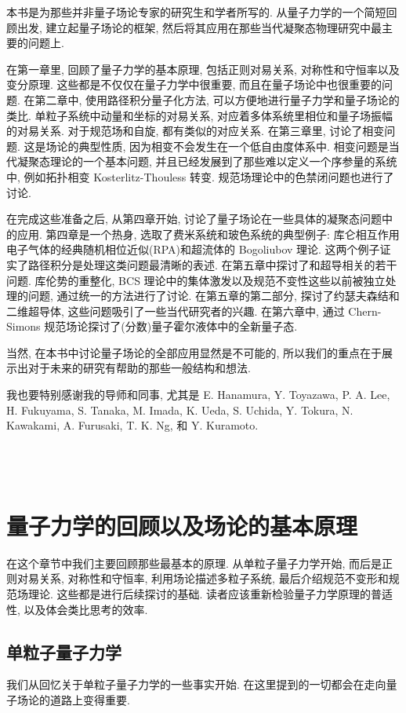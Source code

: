 \documentclass[b5paper]{book}
\begin{document}
{本书是为那些并非量子场论专家的研究生和学者所写的. 从量子力学的一个简短回顾出发, 建立起量子场论的框架, 然后将其应用在那些当代凝聚态物理研究中最主要的问题上.

在第一章里, 回顾了量子力学的基本原理, 包括正则对易关系, 对称性和守恒率以及变分原理. 这些都是不仅仅在量子力学中很重要, 而且在量子场论中也很重要的问题. 在第二章中, 使用路径积分量子化方法, 可以方便地进行量子力学和量子场论的类比. 单粒子系统中动量和坐标的对易关系, 对应着多体系统里相位和量子场振幅的对易关系. 对于规范场和自旋, 都有类似的对应关系. 在第三章里, 讨论了相变问题. 这是场论的典型性质, 因为相变不会发生在一个低自由度体系中. 相变问题是当代凝聚态理论的一个基本问题, 并且已经发展到了那些难以定义一个序参量的系统中, 例如拓扑相变 Kosterlitz-Thouless 转变. 规范场理论中的色禁闭问题也进行了讨论.

在完成这些准备之后, 从第四章开始, 讨论了量子场论在一些具体的凝聚态问题中的应用. 第四章是一个热身, 选取了费米系统和玻色系统的典型例子: 库仑相互作用电子气体的经典随机相位近似(RPA)和超流体的 Bogoliubov 理论. 这两个例子证实了路径积分是处理这类问题最清晰的表述. 在第五章中探讨了和超导相关的若干问题. 库伦势的重整化, BCS 理论中的集体激发以及规范不变性这些以前被独立处理的问题, 通过统一的方法进行了讨论. 在第五章的第二部分, 探讨了约瑟夫森结和二维超导体, 这些问题吸引了一些当代研究者的兴趣. 在第六章中, 通过 Chern-Simons 规范场论探讨了(分数)量子霍尔液体中的全新量子态.

当然, 在本书中讨论量子场论的全部应用显然是不可能的, 所以我们的重点在于展示出对于未来的研究有帮助的那些一般结构和想法.

我也要特别感谢我的导师和同事, 尤其是 E. Hanamura, Y. Toyazawa, P. A. Lee, H. Fukuyama, S. Tanaka, M. Imada, K. Ueda, S. Uchida, Y. Tokura, N. Kawakami, A. Furusaki, T. K. Ng, 和 Y. Kuramoto.
\\
\\
\\
\\

}
\tableofcontents
\mainmatter
\chapter{量子力学的回顾以及场论的基本原理}
在这个章节中我们主要回顾那些最基本的原理. 从单粒子量子力学开始, 而后是正则对易关系, 对称性和守恒率, 利用场论描述多粒子系统, 最后介绍规范不变形和规范场理论. 这些都是进行后续探讨的基础. 读者应该重新检验量子力学原理的普适性, 以及体会类比思考的效率. 
\section{单粒子量子力学}
我们从回忆关于单粒子量子力学的一些事实开始. 在这里提到的一切都会在走向量子场论的道路上变得重要.
\end{document}

